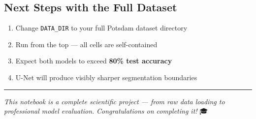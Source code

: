 \documentclass[11pt]{article}
\providecommand{\tightlist}{%
      \setlength{\itemsep}{0pt}\setlength{\parskip}{0pt}}
\begin{document}
\subsection{Next Steps with the Full
Dataset}\label{next-steps-with-the-full-dataset}

\begin{enumerate}
\def\labelenumi{\arabic{enumi}.}
\tightlist
\item
  Change \texttt{DATA\_DIR} to your full Potsdam dataset directory
\item
  Run from the top --- all cells are self-contained
\item
  Expect both models to exceed \textbf{80\% test accuracy}
\item
  U-Net will produce visibly sharper segmentation boundaries
\end{enumerate}

\begin{center}\rule{0.5\linewidth}{0.5pt}\end{center}

\emph{This notebook is a complete scientific project --- from raw data
loading to professional model evaluation.} \emph{Congratulations on
completing it!} 🎓


    
    
    
\end{document}

